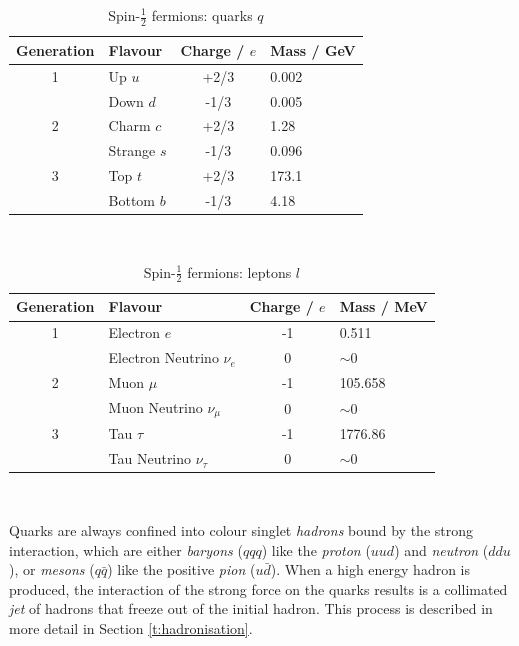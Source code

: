 		\begin{table}[ht]
			\caption{Spin-$\frac{1}{2}$ fermions: quarks $q$ \cite{pdg}}
			\label{t:tab:quark}
			\medskip
			\centering
			\begin{tabular}{clcl}\toprule
				Generation & Flavour & Charge / $e$ & Mass / GeV \\\midrule
				1    &     Up $u$      &    +2/3   & 0.002\\
	    &     Down $d$    &    -1/3   & 0.005\\
		    	2    &     Charm $c$      &    +2/3   & 1.28\\
		    	&     Strange $s$    &    -1/3   & 0.096\\
				3    &     Top $t$  &   +2/3   & 173.1\\
	    &     Bottom $b$   &   -1/3   & 4.18\\\bottomrule
			\end{tabular}\\[5pt]
		\end{table}
		\begin{table}[ht]
			\caption{Spin-$\frac{1}{2}$ fermions: leptons $l$ \cite{pdg}}
			\label{t:tab:lepton}
			\medskip
			\centering
			\begin{tabular}{clcl}\toprule
				Generation & Flavour & Charge / $e$ & Mass / MeV\\\midrule
				1    &     Electron $e$      &    -1   & 0.511\\
				&     Electron Neutrino $\nu_e$    &   0  & $\sim$0\\
				2    &     Muon $\mu$      &    -1   & 105.658\\
				&     Muon Neutrino $\nu_\mu$    &    0   & $\sim$0\\
				3    &     Tau $\tau$  &   -1   & 1776.86\\
				&     Tau Neutrino $\nu_\tau$   &   0   & $\sim$0\\\bottomrule
			\end{tabular}\\[5pt]
		\end{table}

		Quarks are always confined into colour singlet \textit{hadrons} bound by the strong interaction, which are either \textit{baryons} ($qqq$) like the \textit{proton} ($uud$) and \textit{neutron} ($ddu$), or \textit{mesons} ($q\bar{q}$) like the positive \textit{pion} ($u\bar{d}$). When a high energy hadron is produced, the interaction of the strong force on the quarks results is a collimated \textit{jet} of hadrons that freeze out of the initial hadron. This process is described in more detail in Section \ref{t:hadronisation}.

